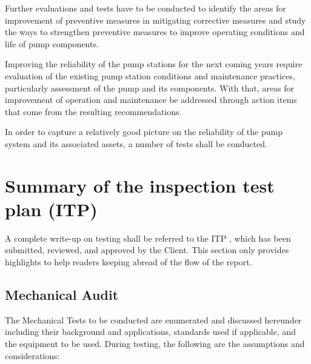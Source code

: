 

Further evaluations and tests have to be conducted to identify the areas for improvement of preventive measures in mitigating corrective measures and study the ways to strengthen preventive measures to improve operating conditions and life of pump components. 

Improving the reliability of the pump stations for the next coming years require evaluation of the existing pump station conditions and maintenance practices, particularly assessment of the pump and its components. With that, areas for improvement of operation and maintenance be addressed through action items that come from the resulting recommendations.

In order to capture a relatively good picture on the reliability of the pump system and its associated assets, a number of tests shall be conducted. 

\section{Summary of the inspection test plan (ITP)}
\label{231}
A complete write-up on testing shall be referred to the ITP \cite{GHD2018i}, which has been submitted, reviewed, and approved by the Client. This section only provides highlights to help readers keeping abread of the flow of the report.

\subsection{Mechanical Audit}
\label{232}
The Mechanical Tests to be conducted are enumerated and discussed hereunder including their background and applications, standards used if applicable, and the equipment to be used. During testing, the following are the assumptions and considerations:

